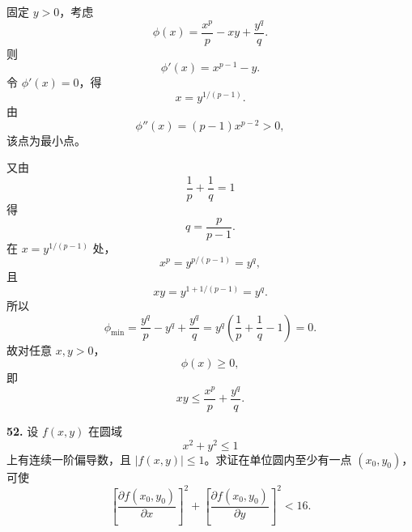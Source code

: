 \begin{solutionblock}
固定 \(y>0\)，考虑
\[
\phi(x)=\frac{x^p}{p}-xy+\frac{y^q}{q}.
\]
则
\[
\phi'(x)=x^{p-1}-y.
\]
令 \(\phi'(x)=0\)，得
\[
x=y^{1/(p-1)}.
\]
由
\[
\phi''(x)=(p-1)x^{p-2}>0,
\]
该点为最小点。

又由
\[
\frac1p+\frac1q=1
\]
得
\[
q=\frac{p}{p-1}.
\]
在 \(x=y^{1/(p-1)}\) 处，
\[
x^p=y^{p/(p-1)}=y^q,
\]
且
\[
xy=y^{1+1/(p-1)}=y^q.
\]
所以
\[
\phi_{\min}=\frac{y^q}{p}-y^q+\frac{y^q}{q}
=y^q\left(\frac1p+\frac1q-1\right)=0.
\]
故对任意 \(x,y>0\)，
\[
\phi(x)\ge0,
\]
即
\[
\boxed{xy\le \frac{x^p}{p}+\frac{y^q}{q}}.
\]
\end{solutionblock}

\begin{problemblock}
\textbf{52.} 设 \(f(x,y)\) 在圆域
\[
x^2+y^2\le1
\]
上有连续一阶偏导数，且 \(|f(x,y)|\le1\)。求证在单位圆内至少有一点
\((x_0,y_0)\)，可使
\[
\left[\frac{\partial f(x_0,y_0)}{\partial x}\right]^2+
\left[\frac{\partial f(x_0,y_0)}{\partial y}\right]^2<16.
\]
\end{problemblock}

